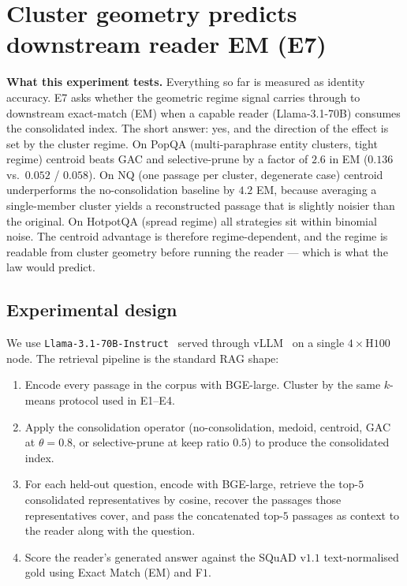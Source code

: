 \section{Cluster geometry predicts downstream reader EM (E7)}
\label{sec:e7}

\begin{intuition}
\textbf{What this experiment tests.} Everything so far is measured
as identity accuracy. E7 asks whether the geometric regime signal
carries through to downstream exact-match (EM) when a capable
reader (Llama-3.1-70B) consumes the consolidated index. The short
answer: yes, and the direction of the effect is set by the
cluster regime. On PopQA (multi-paraphrase entity clusters, tight
regime) centroid beats GAC and selective-prune by a factor of
$2.6$ in EM ($0.136$ vs.\ $0.052$ / $0.058$). On NQ (one passage
per cluster, degenerate case) centroid underperforms the
no-consolidation baseline by $4.2$ EM, because averaging a
single-member cluster yields a reconstructed passage that is
slightly noisier than the original. On HotpotQA (spread regime)
all strategies sit within binomial noise. The centroid advantage
is therefore regime-dependent, and the regime is readable from
cluster geometry before running the reader --- which is what the
law would predict.
\end{intuition}

\subsection{Experimental design}
\label{sec:e7:design}

We use \texttt{Llama-3.1-70B-Instruct}~\cite{llama31} served through
vLLM~\cite{kwon2023vllm} on a single $4\times$H$100$ node. The
retrieval pipeline is the standard RAG shape:

\begin{enumerate}[leftmargin=1.8em, itemsep=2pt]
\item Encode every passage in the corpus with BGE-large. Cluster by
the same $k$-means protocol used in E1--E4.
\item Apply the consolidation operator (no-consolidation, medoid,
centroid, GAC at $\theta = 0.8$, or selective-prune at keep ratio
$0.5$) to produce the consolidated index.
\item For each held-out question, encode with BGE-large, retrieve the
top-$5$ consolidated representatives by cosine, recover the passages
those representatives cover, and pass the concatenated top-$5$
passages as context to the reader along with the question.
\item Score the reader's generated answer against the SQuAD v$1.1$
text-normalised gold using Exact Match (EM) and F$1$.
\end{enumerate}

